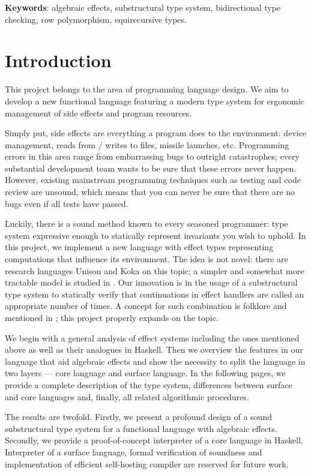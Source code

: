 \documentclass[a4paper,14pt]{extreport}
\begin{document}
\textbf{Keywords}: algebraic effects, substructural type system, bidirectional
type checking, row polymorphism, equirecursive types.

\chapter{Introduction}

This project belongs to the area of programming language design. We aim to
develop a new functional language featuring a modern type system for ergonomic
management of side effects and program resources.

Simply put, side effects are everything a program does to the environment:
device management, reads from / writes to files, missile launches, etc.
Programming errors in this area range from embarrassing bugs to outright
catastrophes; every substantial development team wants to be sure that these
errors never happen. However, existing mainstream programming techniques such as
testing and code review are unsound, which means that you can never be sure that
there are no bugs even if all tests have passed.

Luckily, there is a sound method known to every seasoned programmer: type system
expressive enough to statically represent invariants you wish to uphold. In this
project, we implement a new language with effect types representing computations
that influence its environment. The idea is not novel: there are research
languages Unison \cite{unison} and Koka \cite{koka} on this topic; a simpler and
somewhat more tractable model is studied in \cite{bauer}. Our innovation is in
the usage of a substructural type system to statically verify that continuations
in effect handlers are called an appropriate number of times. A concept for such
combination is folklore and mentioned in \cite{folklore}; this project properly
expands on the topic.

We begin with a general analysis of effect systems including the ones mentioned
above as well as their analogues in Haskell. Then we overview the features in
our language that aid algebraic effects and show the necessity to split the
language in two layers --- core language and surface language. In the following
pages, we provide a complete description of the type system, differences between
surface and core languages and, finally, all related algorithmic procedures.

The results are twofold. Firstly, we present a profound design of a sound
substructural type system for a functional language with algebraic effects.
Secondly, we provide a proof-of-concept interpreter of a core language in
Haskell. Interpreter of a surface language, formal verification of soundness and
implementation of efficient self-hosting compiler are reserved for future work.
\end{document}
